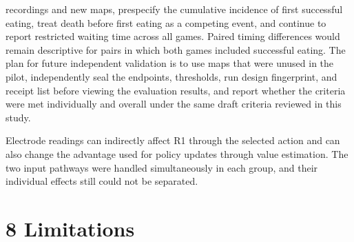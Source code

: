 \documentclass{article}
\begin{document}
recordings and new maps, prespecify the cumulative incidence of first successful eating, treat death before first eating as a competing event, and continue to report restricted waiting time across all games. Paired timing differences would remain descriptive for pairs in which both games included successful eating. The plan for future independent validation is to use maps that were unused in the pilot, independently seal the endpoints, thresholds, run design fingerprint, and receipt list before viewing the evaluation results, and report whether the criteria were met individually and overall under the same draft criteria reviewed in this study.


Electrode readings can indirectly affect R1 through the selected action and can also change the advantage used for policy updates through value estimation. The two input pathways were handled simultaneously in each group, and their individual effects still could not be separated.


\section*{8 Limitations}
\end{document}
